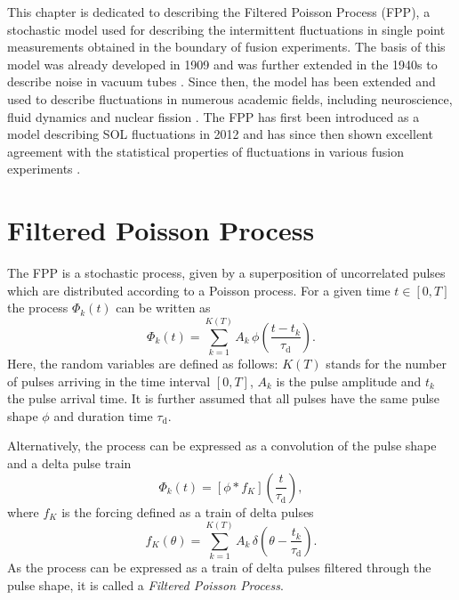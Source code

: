 This chapter is dedicated to describing the Filtered Poisson Process (FPP), a stochastic model used for describing the intermittent fluctuations in single point measurements obtained in the boundary of fusion experiments. The basis of this model was already developed in 1909 \cite{campbell1909study} and was further extended in the 1940s to describe noise in vacuum tubes \cite{rice1944mathematical,rice1945mathematical}. Since then, the model has been extended and used to describe fluctuations in numerous academic fields, including neuroscience, fluid dynamics and nuclear fission 
\cite{segal1985miniature,fesce1986fluctuation,jang2004martingale,claps2005advances,lefebvre2008generalized,daly2010effect,elter2015performance}. The FPP has first been introduced as a model describing SOL fluctuations in 2012 \cite{garcia2012stochastic} and has since then shown excellent agreement with the statistical properties of fluctuations in various fusion experiments \cite{garcia2013intermittent,garcia2013burst,garcia2015intermittent,kube2016fluctuation,garcia2017sol,kube2018intermittent,garcia2018intermittent,theodorsen2018universality}. 

\section{Filtered Poisson Process}
The FPP is a stochastic process, given by a superposition of uncorrelated pulses which are distributed according to a Poisson process. For a given time $t \in [0,T]$ the process $\Phi_k(t)$ can be written as \cite{garcia2012stochastic,garcia2016stochastic}
\begin{equation}
	\Phi_k(t) = \sum_{k=1}^{K(T)} A_k \,\phi\left(\frac{t-t_k}{\tau_\mathrm{d}}\right).
\end{equation}
Here, the random variables are defined as follows: $K(T)$ stands for the number of pulses arriving in the time interval $[0,T]$, $A_k$ is the pulse amplitude and $t_k$ the pulse arrival time. It is further assumed that all pulses have the same pulse  shape $\phi$ and duration time $\tau_\mathrm{d}$.

Alternatively, the process can be expressed as a convolution of the pulse shape and a delta pulse train
\begin{equation}\label{conv}
	\Phi_k(t) = [\phi * f_K] \left(\frac{t}{\tau_\mathrm{d}}\right),
\end{equation}
where $f_K$ is the forcing defined as a train of delta pulses
\begin{equation}
	f_K(\theta) = \sum_{k=1}^{K(T)} A_k \,\delta\left(\theta - \frac{t_k}{\tau_\mathrm{d}}\right).
\end{equation}
As the process can be expressed as a train of delta pulses filtered through the pulse shape, it is called a \textit{Filtered Poisson Process}. 

